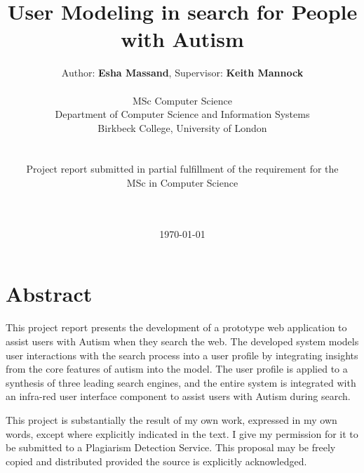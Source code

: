 \documentclass[a4paper, 11pt]{article}
\begin{document}
\LARGE\title{User Modeling in search for People with Autism}

\LARGE\author{Author: \textbf{Esha Massand}, Supervisor: \textbf{Keith Mannock}\\
\\
MSc Computer Science\\Department of Computer Science and Information Systems\\Birkbeck College, University of London\\\\\\Project report submitted in partial fulfillment of the requirement for the \\MSc in Computer Science\date{\mydate\today}
\\\
}

\normalsize


\maketitle


\section*{Abstract}
\begin{justify}
This project report presents the development of a prototype web application to assist users with Autism when they search the web. The developed system models user interactions with the search process into a user profile by integrating insights from the core features of autism into the model. The user profile is applied to a synthesis of three leading search engines, and the entire system is integrated with an infra-red user interface component to assist users with Autism during search.\\
\end{justify}


\begin{justify}
This project is substantially the result of my own work, expressed in my own words, except where explicitly indicated in the text. I give my permission for it to be submitted to a Plagiarism Detection Service. This proposal may be freely copied and distributed provided the source is explicitly acknowledged.
\end{justify}

\begin{verbatim}














\end{verbatim}
\end{document}
